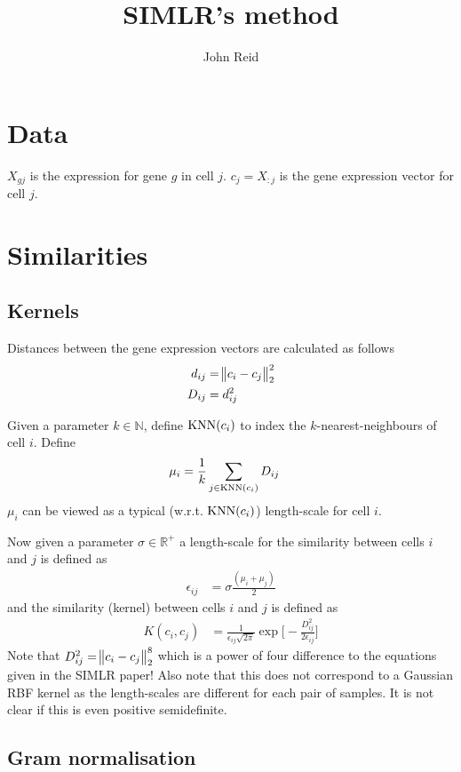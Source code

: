 \documentclass{article}
\title{SIMLR's method}
\author{John Reid}
\newcommand{\knn}{\textnormal{KNN} (c_i)}
\begin{document}
\maketitle


\section{Data}

$X_{gj}$ is the expression for gene $g$ in cell $j$. $c_j = X_{:j}$ is the gene
expression vector for cell $j$.


\section{Similarities}
\subsection{Kernels}

Distances between the gene expression vectors are calculated as follows
\begin{align}
  d_{ij} &= \norm{c_i - c_j}_2^2 \\
  D_{ij} &= d_{ij}^2
\end{align}

Given a parameter $k \in \mathbb{N}$, define $\knn$ to index the
$k$-nearest-neighbours of cell $i$. Define
\begin{align}
  \mu_i &= \frac{1}{k} \sum_{j \in \knn} D_{ij}
\end{align}
$\mu_i$ can be viewed as a typical (w.r.t. $\knn$) length-scale for cell $i$.

Now given a parameter $\sigma \in \mathbb{R}^+$ a length-scale for the similarity
between cells $i$ and $j$ is defined as
\begin{align}
  \epsilon_{ij} &= \sigma \frac{(\mu_i + \mu_j)}{2}
\end{align}
and the similarity (kernel) between cells $i$ and $j$ is defined as
\begin{align}
  K(c_i, c_j) &= \frac{1}{\epsilon_{ij} \sqrt{2 \pi}} \exp \bigg[- \frac{D_{ij}^2}{2 \epsilon_{ij}} \bigg]
\end{align}
Note that $D_{ij}^2 = \norm{c_i - c_j}_2^8$ which is a power of four difference
to the equations given in the SIMLR paper! Also note that this does not
correspond to a Gaussian RBF kernel as the length-scales are different for each
pair of samples. It is not clear if this is even positive semidefinite.


\subsection{Gram normalisation}
\end{document}
